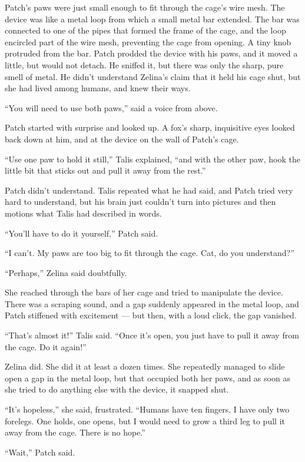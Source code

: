 \documentclass[ebook,oneside,openany,17pt]{memoir}
\begin{document}
Patch’s paws were just small enough to fit through the cage’s wire
mesh. The device was like a metal loop from which a small metal bar
extended. The bar was connected to one of the pipes that formed the
frame of the cage, and the loop encircled part of the wire mesh,
preventing the cage from opening. A tiny knob protruded from the
bar. Patch prodded the device with his paws, and it moved a little,
but would not detach. He sniffed it, but there was only the sharp,
pure smell of metal. He didn’t understand Zelina’s claim that it held
his cage shut, but she had lived among humans, and knew their ways.

“You will need to use both paws,” said a voice from above.

Patch started with surprise and looked up. A fox’s sharp, inquisitive
eyes looked back down at him, and at the device on the wall of Patch’s
cage.

“Use one paw to hold it still,” Talis explained, “and with the other
paw, hook the little bit that sticks out and pull it away from the
rest.”

Patch didn’t understand. Talis repeated what he had said, and Patch
tried very hard to understand, but his brain just couldn’t turn into
pictures and then motions what Talis had described in words.

“You’ll have to do it yourself,” Patch said.

“I can’t. My paws are too big to fit through the cage. Cat, do you
understand?”

“Perhaps,” Zelina said doubtfully.

She reached through the bars of her cage and tried to manipulate the
device. There was a scraping sound, and a gap suddenly appeared in the
metal loop, and Patch stiffened with excitement — but then, with a
loud click, the gap vanished.

“That’s almost it!” Talis said. “Once it’s open, you just have to pull
it away from the cage. Do it again!”

Zelina did. She did it at least a dozen times. She repeatedly managed
to slide open a gap in the metal loop, but that occupied both her
paws, and as soon as she tried to do anything else with the device, it
snapped shut.

“It’s hopeless,” she said, frustrated. “Humans have ten fingers. I
have only two forelegs. One holds, one opens, but I would need to grow
a third leg to pull it away from the cage. There is no hope.”

“Wait,” Patch said.
\end{document}
